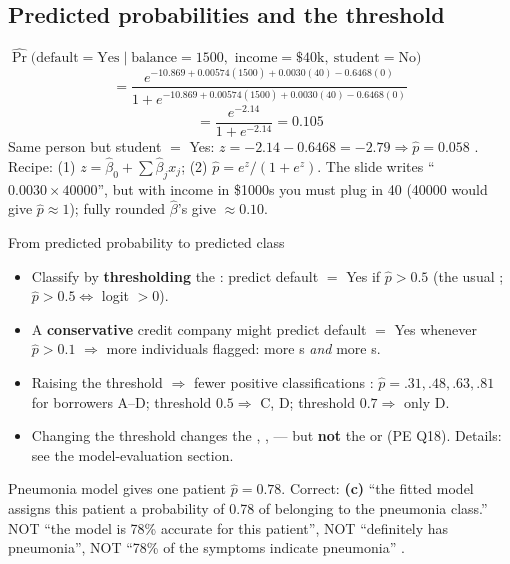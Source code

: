 \subsection{Predicted probabilities and the threshold}

\begin{keybox}
$\widehat{\Pr}(\text{default}=\text{Yes}\mid \text{balance}=1500,$ $\text{income}=\$40\text{k},\ \text{student}=\text{No})$
\[
=\frac{e^{-10.869+0.00574(1500)+0.0030(40)-0.6468(0)}}{1+e^{-10.869+0.00574(1500)+0.0030(40)-0.6468(0)}}
\]
\[
=\frac{e^{-2.14}}{1+e^{-2.14}}=0.105
\]
Same person but student $=$ Yes: $z=-2.14-0.6468=-2.79\Rightarrow\hat p=0.058$ .
{\footnotesize Recipe: (1) $z=\hat\beta_0+\sum\hat\beta_jx_j$; (2) $\hat p=e^z/(1+e^z)$. The slide writes
``$0.0030\times40000$'', but with income in \$1000s you must plug in 40 (40000 would give $\hat p\approx1$);
fully rounded $\hat\beta$'s give $\approx0.10$.}
\end{keybox}

\begin{topic}{From predicted probability to predicted class}
\begin{itemize}
\item Classify by \textbf{thresholding} the : predict default $=$ Yes if
  $\hat p>0.5$ (the usual ; $\hat p>0.5\iff$ logit $>0$).
\item A \textbf{conservative} credit company might predict default $=$ Yes whenever $\hat p>0.1$
  $\Rightarrow$ more individuals flagged: more s \emph{and} more s.
\item Raising the threshold $\Rightarrow$ fewer positive classifications : $\hat p=.31,.48,.63,.81$ for
  borrowers A--D; threshold $0.5\Rightarrow$ C, D; threshold $0.7\Rightarrow$ only D.
\item Changing the threshold changes the , ,  --- but
  \textbf{not} the  or  (PE Q18). Details: see the model-evaluation section.
\end{itemize}
\end{topic}

\begin{trap}
Pneumonia model gives one patient $\hat p=0.78$. Correct: \textbf{(c)} ``the fitted model assigns this patient
a probability of 0.78 of belonging to the pneumonia class.'' NOT ``the model is 78\% accurate for this patient'',
NOT ``definitely has pneumonia'', NOT ``78\% of the symptoms indicate pneumonia'' .
\end{trap}


